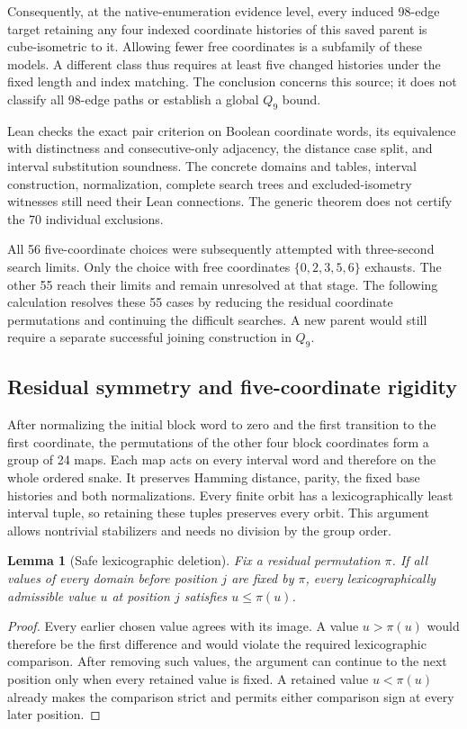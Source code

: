 \documentclass[11pt,a4paper]{article}
\newtheorem{lemma}[theorem]{Lemma}
\theoremstyle{definition}
\theoremstyle{remark}
\begin{document}
Consequently, at the native-enumeration evidence level, every induced
98-edge target retaining any four indexed coordinate histories of
this saved parent is cube-isometric to it. Allowing fewer free
coordinates is a subfamily of these models. A different class thus
requires at least five changed histories under the fixed length and
index matching. The conclusion concerns this source; it does not
classify all 98-edge paths or establish a global $Q_9$ bound.

Lean checks the exact pair criterion on Boolean coordinate words,
its equivalence with distinctness and consecutive-only adjacency,
the distance case split, and interval substitution soundness.
The concrete domains and tables, interval construction, normalization,
complete search trees and excluded-isometry witnesses still need
their Lean connections. The generic theorem does not certify the
70 individual exclusions.

All 56 five-coordinate choices were subsequently attempted with
three-second search limits. Only the choice with free coordinates
$\{0,2,3,5,6\}$ exhausts. The other 55 reach their limits and remain
unresolved at that stage. The following calculation resolves these
55 cases by reducing the residual coordinate permutations and
continuing the difficult searches. A new parent would still require
a separate successful joining construction in $Q_9$.

\subsection{Residual symmetry and five-coordinate rigidity}
\label{sec:history207}
After normalizing the initial block word to zero and the first
transition to the first coordinate, the permutations of the other
four block coordinates form a group of 24 maps. Each map acts on
every interval word and therefore on the whole ordered snake.
It preserves Hamming distance, parity, the fixed base histories
and both normalizations. Every finite orbit has a lexicographically
least interval tuple, so retaining these tuples preserves every orbit.
This argument allows nontrivial stabilizers and needs no division
by the group order.

\begin{lemma}[Safe lexicographic deletion]
Fix a residual permutation $\pi$. If all values of every domain
before position $j$ are fixed by $\pi$, every lexicographically
admissible value $u$ at position $j$ satisfies $u\le\pi(u)$.
\end{lemma}
\begin{proof}
Every earlier chosen value agrees with its image. A value
$u>\pi(u)$ would therefore be the first difference and would
violate the required lexicographic comparison. After removing
such values, the argument can continue to the next position only
when every retained value is fixed. A retained value $u<\pi(u)$
already makes the comparison strict and permits either comparison
sign at every later position.
\end{proof}
\end{document}
